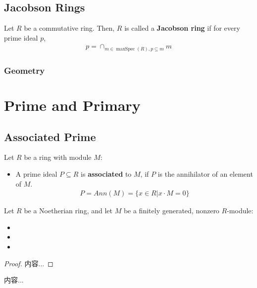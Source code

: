 \documentclass[Total.tex]{subfiles}
\begin{document}
				\subsection{Jacobson Rings}
					\begin{Def}
						Let $R$ be a commutative ring. Then, $R$ is called a \textbf{Jacobson ring} if for every prime ideal $p$, 
						\begin{gather*}
							p=\cap_{m\in \operatorname{maxSpec}(R),p\subseteq m} m
						\end{gather*}
					\end{Def}
					
					\subsubsection{Geometry}
			\section{Prime and Primary}	
				\subsection{Associated Prime}
					\begin{Def}  Let $R$ be a ring with module $M$:
						\begin{itemize}
							\item 
							A prime ideal $P\subseteq R$ is \textbf{associated} to $M$, if $P$ is the annihilator of an element of $M$. 
							\begin{gather*}
								P=Ann(M)=\{x\in R|x\cdot M=0\}
							\end{gather*}
						\end{itemize}
					\end{Def}
					
					\begin{proposition}
						Let $R$ be a Noetherian ring, and let $M$ be a finitely generated, nonzero $R$-module:
						\begin{itemize}
							\item 
							\item 
							\item 
						\end{itemize}
					\end{proposition}
					\begin{proof}
						内容...
					\end{proof}
					
					\begin{Def}
						内容...
					\end{Def}
					
\end{document}
